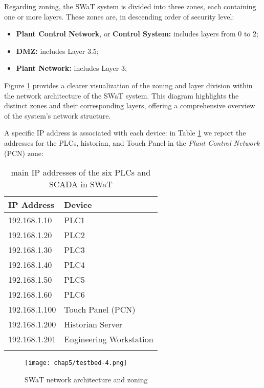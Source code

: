 \bigskip
Regarding zoning, the SWaT system is divided into three zones, each containing one or more layers. These zones are, in descending order of security level: 

\begin{itemize}
	\item \textbf{Plant Control Network}, or \textbf{Control System:} includes layers from 0 to 2;
	\item \textbf{DMZ:} includes Layer 3.5;
	\item \textbf{Plant Network:} includes Layer 3;
\end{itemize}

Figure \ref{fig:5_swat_network_arch} \cite{swat_home} provides a clearer visualization of the zoning and layer division within the network architecture of the SWaT system. This diagram highlights the distinct zones and their corresponding layers, offering a comprehensive overview of the system's network structure.

\bigskip
A specific IP address is associated with each device: in Table \ref{table:5_swat_ip_addresses} we report the addresses for the PLCs, historian, and Touch Panel in the \textit{Plant Control Network} (PCN) zone:

\bigskip
{\small
\begin{longtable}[c]{p{} p{}}
	\hline
	\textbf{IP Address} & \textbf{Device} \\ [0.5ex] 
	\hline
	192.168.1.10 & PLC1 \\
	\hline 
	192.168.1.20 & PLC2 \\
	\hline
	192.168.1.30 & PLC3 \\
	\hline
	192.168.1.40 & PLC4 \\
	\hline
	192.168.1.50 & PLC5 \\
	\hline
	192.168.1.60 & PLC6 \\
	\hline
	192.168.1.100 & {Touch Panel (PCN)} \\
	\hline
	192.168.1.200 & Historian Server \\
	\hline
	192.168.1.201 & Engineering Workstation \\
	\hline
	
	\caption{main IP addresses of the six PLCs and SCADA in SWaT}
	\label{table:5_swat_ip_addresses}
\end{longtable}
}

\begin{figure}[ht]
	\centering
	\texttt{[image: chap5/testbed-4.png]}
	\caption{SWaT network architecture and zoning}
	\label{fig:5_swat_network_arch}
\end{figure}

